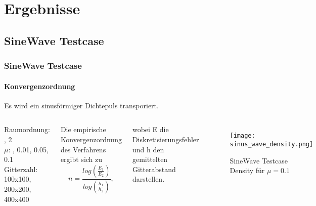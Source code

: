 \documentclass[
	11pt, %
	aspectratio=169, %
]{beamer}
\begin{document}
\section{Ergebnisse}

\subsection{SineWave Testcase}


\begin{frame}
	\frametitle{SineWave Testcase}
	\framesubtitle{Konvergenzordnung}
	Es wird ein sinusförmiger Dichtepuls transporiert.
	
\begin{columns}
	
	Raumordnung: , 2\\
	$\mu$: \quad \quad \quad \quad \quad \quad {}, 0.01, 0.05, 0.1\\
	Gitterzahl: \quad \quad \quad 100x100, 200x200, 400x400
	\vspace*{0.5cm}


	Die empirische Konvergenzordnung des Verfahrens ergibt sich zu
	\begin{equation}
		n=\frac{log(\frac{E_1}{E_2})}{log(\frac{h_1}{h_2})},
	\end{equation}
	
	wobei E die Diskretisierungsfehler und h den gemittelten Gitterabstand darstellen.

	\vspace*{-2cm}
	\begin{figure}
		\texttt{[image: sinus\_wave\_density.png]}
		\vspace*{-1cm}
		\caption{SineWave Testcase Density für $\mu=0.1$}
	\end{figure}
\end{columns}
\end{frame}





\end{document}
